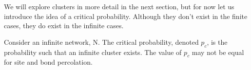 We will explore clusters in more detail in the next section, but for now let us introduce the idea of a critical probability. Although they don't exist in the finite cases, they do
exist in the infinite cases.

\begin{definition}\label{def:critical probability}
  Consider an infinite network, N. The critical probability, denoted $p_c$, is the probability such that an infinite cluster exists. The value of $p_c$ may not  be equal for site
  and bond percolation.
\end{definition}
